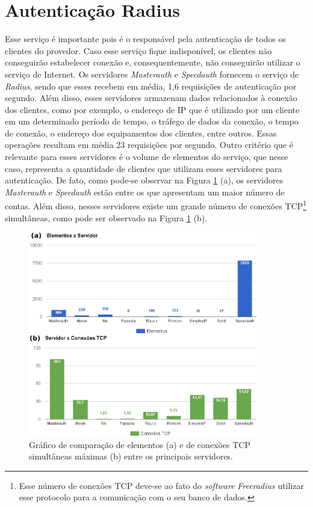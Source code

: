 \section{Autenticação Radius}
\label{section:radius}

Esse serviço é importante pois é o responsável pela autenticação de todos os clientes do provedor. Caso esse serviço fique indisponível, 
os clientes não conseguirão estabelecer conexão e, consequentemente, não conseguirão utilizar o serviço de Internet. Os servidores 
\textit{Masterauth} e \textit{Speedauth} fornecem o serviço de \textit{Radius}, sendo que esses recebem em média, 1,6 requisições de autenticação 
por segundo. Além disso, esses servidores armazenam dados relacionados à conexão dos clientes, como por exemplo, o endereço de \ac{IP} que é 
utilizado por um cliente em um determinado período de tempo, o tráfego de dados da conexão, o tempo de conexão, o endereço  dos 
equipamentos dos clientes, entre outros. Essas operações resultam em média 23 requisições por segundo. 
Outro critério que é relevante para esses servidores é o volume de elementos do serviço, que nesse caso, representa a quantidade de clientes que
utilizam esses servidores para autenticação. De fato, como pode-se observar na Figura \ref{fig:elementos_tcp} (a), os servidores 
\textit{Masterauth} e \textit{Speedauth} estão entre os que apresentam um maior número de contas. Além disso, nesses servidores existe um grande 
número de conexões \ac{TCP}\footnote[1]{Esse número de conexões \ac{TCP} deve-se ao fato do \textit{software} \textit{Freeradius} utilizar esse 
protocolo para a comunicação com o seu banco de dados.} simultâneas, como pode ser observado na Figura \ref{fig:elementos_tcp} (b).


\begin{figure}[h!]
 \centering
 \includegraphics[width=380px]{img/elementos_tcp.eps}
 \caption{Gráfico de comparação de elementos (a) e de conexões TCP simultâneas máximas (b) entre os principais servidores.}
 \label{fig:elementos_tcp}
\end{figure}

